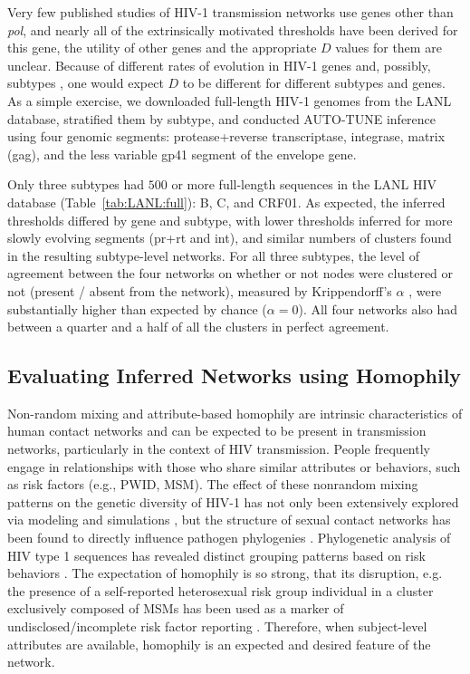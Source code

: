 \documentclass[utf8]{FrontiersinHarvard} %
\begin{document}
Very few published studies of HIV-1 transmission networks use genes other than
	{\it pol}, and nearly all of the extrinsically motivated thresholds have been
derived for this gene, the utility of other genes and the appropriate $D$
values for them are unclear. Because of different rates of evolution in HIV-1
genes and, possibly, subtypes \cite{Penn:2008aa}, one would expect $D$ to be
different for different subtypes and genes. As a simple exercise, we downloaded
full-length HIV-1 genomes from the LANL database, stratified them by subtype,
and conducted AUTO-TUNE inference using four genomic segments: protease+reverse
transcriptase, integrase, matrix (gag), and the less variable gp41 segment of
the envelope gene.

Only three subtypes had $500$ or more full-length sequences in the LANL HIV
database (Table~\ref{tab:LANL:full}): B, C, and CRF01. As expected, the
inferred thresholds differed by gene and subtype, with lower thresholds
inferred for more slowly evolving segments (pr+rt and int), and similar numbers
of clusters found in the resulting subtype-level networks. For all three
subtypes, the level of agreement between the four networks on whether or not
nodes were clustered or not (present / absent from the network), measured by
Krippendorff's $\alpha$ \cite{doi:10.1080/19312450709336664}, were
substantially higher than expected by chance ($\alpha = 0$). All four networks
also had between a quarter and a half of all the clusters in perfect agreement. 

\subsection{Evaluating Inferred Networks using Homophily}

Non-random mixing and attribute-based homophily are intrinsic characteristics
of human contact networks and can be expected to be present in transmission
networks, particularly in the context of HIV transmission. People frequently
engage in relationships with those who share similar attributes or behaviors,
such as risk factors (e.g., PWID, MSM). The effect of these nonrandom mixing
patterns on the genetic diversity of HIV-1 has not only been extensively
explored via modeling and simulations \citep{goodreau_assessing_2006}, but the
structure of sexual contact networks has been found to directly influence
pathogen phylogenies \citep{robinson_how_2013}. Phylogenetic analysis of HIV
type 1 sequences has revealed distinct grouping patterns based on risk
behaviors \citep{holmes_molecular_1995}. The expectation of homophily is so
strong, that its disruption, e.g. the presence of a self-reported heterosexual
risk group individual in a cluster exclusively composed of MSMs has been used
as a marker of undisclosed/incomplete risk factor reporting
\cite{Ragonnet-Cronin:2018aa}. Therefore, when subject-level attributes are
available, homophily is an expected and desired feature of the network.
\end{document}
